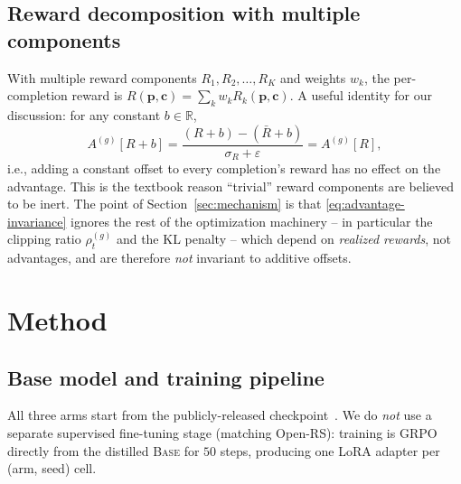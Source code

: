 \documentclass[journal,onecolumn,11pt]{IEEEtran}
\newcommand{\base}{\textsc{Base}}
\newcommand{\R}[1]{R_{#1}}
\begin{document}
\subsection{Reward decomposition with multiple components}
With multiple reward components $\R{1},\R{2},\ldots,\R{K}$ and weights
$w_k$, the per-completion reward is
$R(\mathbf{p},\mathbf{c}) = \sum_k w_k \R{k}(\mathbf{p},\mathbf{c})$.
A useful identity for our discussion: for any constant $b\in\mathbb{R}$,
\begin{equation}
A^{(g)}\!\left[R + b\right]
= \frac{(R + b) - (\bar{R}+b)}{\sigma_R + \varepsilon}
= A^{(g)}\!\left[R\right],
\label{eq:advantage-invariance}
\end{equation}
i.e., adding a constant offset to every completion's reward has no effect on
the advantage. This is the textbook reason ``trivial'' reward components are
believed to be inert. The point of Section~\ref{sec:mechanism} is that
\eqref{eq:advantage-invariance} ignores the rest of the optimization
machinery -- in particular the clipping ratio $\rho_t^{(g)}$ and the KL
penalty -- which depend on \emph{realized rewards}, not advantages, and are
therefore \emph{not} invariant to additive offsets.

\section{Method}
\label{sec:method}

\subsection{Base model and training pipeline}
All three arms start from the publicly-released
checkpoint~\cite{deepseekR1_2025}. We do \emph{not} use a separate
supervised fine-tuning stage (matching Open-RS): training is GRPO directly
from the distilled \base{} for $50$ steps, producing one LoRA adapter per
(arm, seed) cell.
\end{document}
